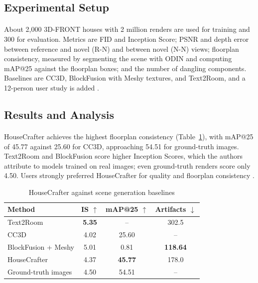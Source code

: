 \documentclass[12pt,a4paper,final]{extreport}
\begin{document}
\subsection{Experimental Setup}

\paragraph{} About 2{,}000 3D-FRONT houses with 2 million renders are used for training and 300 for evaluation. Metrics are FID and Inception Score; PSNR and depth error between reference and novel (R-N) and between novel (N-N) views; floorplan consistency, measured by segmenting the scene with ODIN and computing mAP@25 against the floorplan boxes; and the number of dangling components. Baselines are CC3D, BlockFusion with Meshy textures, and Text2Room, and a 12-person user study is added \cite{p2}.

\subsection{Results and Analysis}

\paragraph{} HouseCrafter achieves the highest floorplan consistency (Table~\ref{tab:p2_main}), with mAP@25 of 45.77 against 25.60 for CC3D, approaching 54.51 for ground-truth images. Text2Room and BlockFusion score higher Inception Scores, which the authors attribute to models trained on real images; even ground-truth renders score only 4.50. Users strongly preferred HouseCrafter for quality and floorplan consistency \cite{p2}.

{\renewcommand{\arraystretch}{1.12}
\begin{table}[htbp]
\centering
\caption{HouseCrafter against scene generation baselines}\label{tab:p2_main}
\small
\begin{tabular}{|l|c|c|c|}
\hline
\textbf{Method} & \textbf{IS $\uparrow$} & \textbf{mAP@25 $\uparrow$} & \textbf{Artifacts $\downarrow$} \\ \hline
Text2Room & \textbf{5.35} & -- & 302.5 \\ \hline
CC3D & 4.02 & 25.60 & -- \\ \hline
BlockFusion + Meshy & 5.01 & 0.81 & \textbf{118.64} \\ \hline
HouseCrafter & 4.37 & \textbf{45.77} & 178.0 \\ \hline
Ground-truth images & 4.50 & 54.51 & -- \\ \hline
\end{tabular}
\end{table}}
\end{document}
